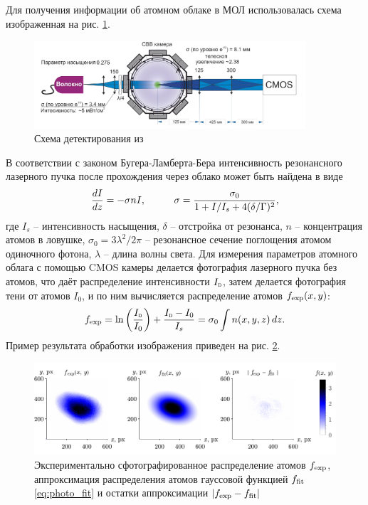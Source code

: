 Для получения информации об атомном облаке в МОЛ использовалась схема изображенная на рис. \ref{fig:exp_photo}. 

\begin{figure}[ht]
    \centering
    \includegraphics[width=0.9\textwidth]{figs/detect.png}
    \caption{Схема детектирования из \cite{vlad}}
    \label{fig:exp_photo}
\end{figure}


В соответствии с законом Бугера-Ламберта-Бера интенсивность резонансного лазерного пучка после прохождения через облако может быть найдена в виде
\begin{equation}
    \frac{d I}{d z} = - \sigma n I,
    \hspace{10 mm} 
    \sigma = \frac{\sigma_0}{1+I/I_s + 4 (\delta/\Gamma)^2},
    \label{eq:deltaG}
\end{equation}
где $I_s$ -- интенсивность насыщения, $\delta$ -- отстройка от резонанса, $n$ -- концентрация атомов в ловушке, $\sigma_0 = 3 \lambda^2 / 2\pi$ -- резонансное сечение поглощения атомом одиночного фотона, $\lambda$ -- длина волны света. Для измерения параметров атомного облага с помощью CMOS камеры делается фотография лазерного пучка без атомов, что даёт распределение интенсивности $\subt{I}{D}$, затем делается фотография тени от атомов $I_0$, и по ним вычисляется распределение атомов $f_{\textnormal{exp}}(x, y)$:
\begin{equation}
    \sub{f}{exp} = \ln\left(\frac{\subt{I}{D}}{I_0}\right) + \frac{\subt{I}{D} - I_0}{I_s} = \sigma_0 \int n(x, y, z) \d z.
\end{equation}
Пример результата обработки изображения приведен на рис. \ref{fig:fitmot}.

\begin{figure}[ht]
    \centering
    \includegraphics{figs/fit_mot_v2.pdf}
    \caption{Экспериментально сфотографированное распределение атомов $f_{\textnormal{exp}}$, аппроксимация распределения атомов гауссовой функцией $f_{\textnormal{fit}}$ \eqref{eq:photo_fit} и остатки аппроксимации $|f_{\textnormal{exp}} - f_{\textnormal{fit}}|$}
    \label{fig:fitmot}
\end{figure}

